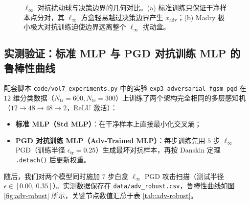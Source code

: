 \begin{figure}[htbp]
{}
  \caption{$\ell_\infty$ 对抗扰动球与决策边界的几何对比。(a) 标准训练只保证干净样本点分对，其 $\ell_\infty$ 方盒轻易越过决策边界产生 $x_{\text{adv}}$；(b) Madry 极小极大对抗训练迫使边界远离整个 $\ell_\infty$ 扰动盒。}
  \label{fig:adv-geometry}
\end{figure}

\subsection{实测验证：标准 MLP 与 PGD 对抗训练 MLP 的鲁棒性曲线}

配套脚本 \texttt{code/vol7\_experiments.py} 中的实验 \texttt{exp3\_adversarial\_\allowbreak fgsm\_pgd} 在 $12$ 维分类数据（$N_{\text{tr}}=600, N_{\text{te}}=300$）上训练了两个架构完全相同的多层感知机（$12 \to 48 \to 48 \to 2$，ReLU 激活）：
\begin{itemize}
  \item \textbf{标准 MLP（Std MLP）}：在干净样本上直接最小化交叉熵；
  \item \textbf{PGD 对抗训练 MLP（Adv-Trained MLP）}：每步训练先用 $5$ 步 $\ell_\infty$ PGD（训练半径 $\epsilon_{\text{tr}} = 0.25$）生成最坏对抗样本，再按 Danskin 定理 \texttt{.detach()} 后更新权重。
\end{itemize}
随后，我们对两个模型同时施加 $7$ 步白盒 $\ell_\infty$ PGD 攻击扫描（测试半径 $\epsilon \in [0.00,\, 0.35]$）。实测数据保存在 \texttt{data/adv\_robust.csv}，鲁棒性曲线如图 \ref{fig:adv-robust} 所示，关键节点数值汇总于表 \ref{tab:adv-robust}。

